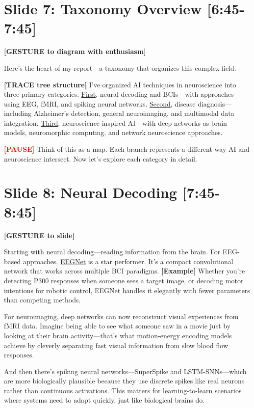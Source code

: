 \documentclass[12pt]{article}
\begin{document}
\hrulefill

\section*{Slide 7: Taxonomy Overview [6:45-7:45]}

\textcolor{DukeBlue}{\textbf{[GESTURE to diagram with enthusiasm]}}

Here's the heart of my report—a taxonomy that organizes this complex field.

\textcolor{DukeBlue}{\textbf{[TRACE tree structure]}} I've organized AI techniques in neuroscience into three primary categories. \ul{First}, neural decoding and BCIs—with approaches using EEG, fMRI, and spiking neural networks. \ul{Second}, disease diagnosis—including Alzheimer's detection, general neuroimaging, and multimodal data integration. \ul{Third}, neuroscience-inspired AI—with deep networks as brain models, neuromorphic computing, and network neuroscience approaches.

\textcolor{red}{\textbf{[PAUSE]}} Think of this as a map. Each branch represents a different way AI and neuroscience intersect. Now let's explore each category in detail.

\hrulefill

\section*{Slide 8: Neural Decoding [7:45-8:45]}

\textcolor{DukeBlue}{\textbf{[GESTURE to slide]}}

Starting with neural decoding—reading information from the brain. For EEG-based approaches, \ul{EEGNet} is a star performer. It's a compact convolutional network that works across multiple BCI paradigms. \textcolor{green!60!black}{\textbf{[Example]}} Whether you're detecting P300 responses when someone sees a target image, or decoding motor intentions for robotic control, EEGNet handles it elegantly with fewer parameters than competing methods.

For neuroimaging, deep networks can now reconstruct visual experiences from fMRI data. Imagine being able to see what someone saw in a movie just by looking at their brain activity—that's what motion-energy encoding models achieve by cleverly separating fast visual information from slow blood flow responses.

And then there's spiking neural networks—SuperSpike and LSTM-SNNs—which are more biologically plausible because they use discrete spikes like real neurons rather than continuous activations. This matters for learning-to-learn scenarios where systems need to adapt quickly, just like biological brains do.
\end{document}
